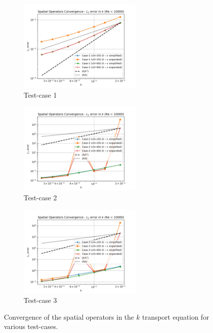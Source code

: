 \begin{figure}[htbp!]
  \begin{subfigure}{7cm}
    \centering\includegraphics[width=6cm]{Code-Figures/keps/keps-op-conv/k_conv_tc_1_re_10000.png}
    \caption{Test-case 1}
  \end{subfigure}
  \begin{subfigure}{7cm}
    \centering\includegraphics[width=6cm]{Code-Figures/keps/keps-op-conv/k_conv_tc_2_re_10000.png}
    \caption{Test-case 2}
  \end{subfigure}
  \begin{subfigure}{7cm}
    \centering\includegraphics[width=6cm]{Code-Figures/keps/keps-op-conv/k_conv_tc_3_re_10000.png}
    \caption{Test-case 3}
  \end{subfigure}
  \caption{Convergence of the spatial operators in the $k$ transport equation for various test-cases.}
  \label{fig:k-spatial-ooc}
\end{figure}

